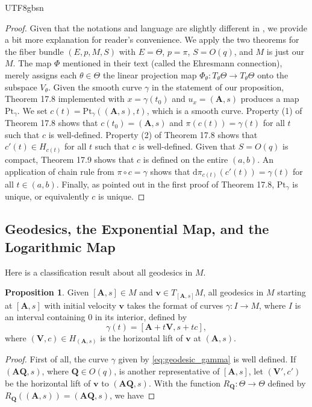 \documentclass[12pt]{report}
\theoremstyle{plain}
\theoremstyle{definition}
\newtheorem{proposition}[theorem]{Proposition}
\begin{document}
\begin{CJK*}{UTF8}{gbsn}
\begin{proof}
Given that the notations and language are slightly different in \citealp{Michor_2008},
we provide a bit more explanation for reader's convenience. 
We apply the two theorems for the fiber bundle $(E, p, M, S)$ with $E = \Theta$, $p = \pi$, $S = O(q)$,
and $M$ is just our $M$. 
The map $\Phi$ mentioned in their text (called the Ehresmann connection),
merely assigns each $\theta \in \Theta$ 
the linear projection map $\Phi_{\theta}:T_{\theta}\Theta \to T_{\theta}\Theta$
onto the subspace $V_{\theta}$.
Given the smooth curve $\gamma$ in the statement of our proposition,
Theorem 17.8 implemented with $x = \gamma(t_0)$ and $u_x = (\bm{A},s)$
produces a map $\text{Pt}_{\gamma}$.
We set $c(t) = \text{Pt}_{\gamma}((\bm{A},s),t)$, which is a smooth curve.
Property (1) of Theorem 17.8 shows that $c(t_0) = (\bm{A},s)$
and $\pi(c(t)) = \gamma(t)$ for all $t$ such that $c$ is well-defined.
Property (2) of Theorem 17.8 shows that $c'(t) \in H_{c(t)}$ 
for all $t$ such that $c$ is well-defined.
Given that $S = O(q)$ is compact, Theorem 17.9
shows that $c$ is defined on the entire $(a,b)$.
An application of chain rule from $\pi \circ c = \gamma$
shows that $\mathrm{d} \pi_{c(t)}(c'(t)) = \gamma(t)$
for all $t \in (a,b)$.
Finally, as pointed out in the first proof of Theorem 17.8,
$\text{Pt}_{\gamma}$ is unique, or equivalently $c$ is unique.
\end{proof}

\subsection{Geodesics, the Exponential Map, and the Logarithmic Map}
Here is a classification result about all geodesics in $M$.

\begin{proposition}\label{thm:geodesic_classification}
Given $[\bm{A},s] \in M$ and $\bm{v} \in T_{[\bm{A},s]}M$, 
all geodesics in $M$ starting at $[\bm{A},s]$ with initial velocity 
$\bm{v}$ takes the format of curves 
$\gamma: I \to M$, where $I$ is an interval containing $0$ in its interior,
defined by 
\begin{equation}\label{eq:geodesic_gamma}
  \gamma(t) = [\bm{A} + t\bm{V}, s + tc],
\end{equation}
where $(\bm{V},c) \in H_{(\bm{A},s)}$ is the horizontal lift 
of $\bm{v}$ at $ (\bm{A},s)$.
\end{proposition}

\begin{proof}
First of all, the curve $\gamma$ given by \eqref{eq:geodesic_gamma} is well defined. 
If $(\bm{A}\bm{Q},s)$, where $\bm{Q} \in O(q)$, is another representative of $[\bm{A},s]$,
let $(\bm{V}',c')$ be the horizontal lift of $\bm{v}$ to $(\bm{A}\bm{Q},s)$.
With the function $R_{\bm{Q}}: \Theta \to \Theta$ defined by $R_{\bm{Q}}((\bm{A},s)) = (\bm{A}\bm{Q},s)$,
we have 


\end{proof}
\end{CJK*}
\end{document}
